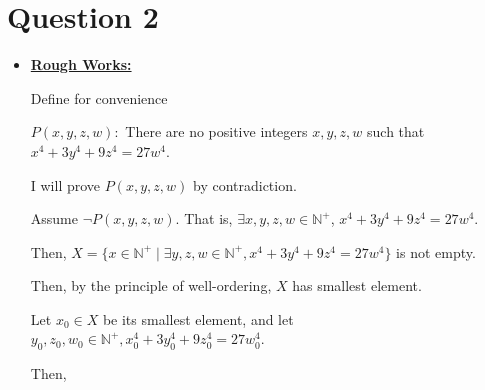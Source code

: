 \documentclass[12pt]{article}
\begin{document}
\bigskip

\section*{Question 2}

\bigskip

\begin{itemize}
    \item

    \begin{mdframed}
    \underline{\textbf{Rough Works:}}

    \bigskip

    Define for convenience

    \begin{center}
        $P(x,y,z,w):$ There are no positive integers $x,y,z,w$ such that $x^4 + 3y^4 + 9z^4 = 27w^4$.
    \end{center}

    \bigskip

    I will prove $P(x,y,z,w)$ by contradiction.

    \bigskip

    Assume $\neg P(x,y,z,w)$. That is, $\exists x,y,z,w \in \mathbb{N}^+$,
    $x^4 + 3y^4 + 9z^4 = 27w^4$.

    \bigskip

    Then, $X = \{x \in \mathbb{N}^+ \mid \exists y,z,w \in \mathbb{N}^+, x^4+3y^4+9z^4 = 27w^4\}$
    is not empty.

    \bigskip

    Then, by the principle of well-ordering, $X$ has smallest element.

    \bigskip

    Let $x_0 \in X$ be its smallest element, and let $y_0,z_0,w_0 \in \mathbb{N}^+,
    x_0^4+3y_0^4+9z_0^4 = 27w_0^4$.

    \bigskip

    Then,


    \end{mdframed}
\end{itemize}
\end{document}
